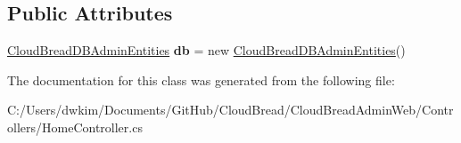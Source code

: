 \subsection*{Public Attributes}
\begin{DoxyCompactItemize}
\item 
\hyperlink{class_cloud_bread_admin_web_1_1_cloud_bread_d_b_admin_entities}{Cloud\+Bread\+D\+B\+Admin\+Entities} {\bfseries db} = new \hyperlink{class_cloud_bread_admin_web_1_1_cloud_bread_d_b_admin_entities}{Cloud\+Bread\+D\+B\+Admin\+Entities}()\hypertarget{class_cloud_bread_admin_web_1_1_controllers_1_1_home_controller_a348051ae2729879d2c661d5b2376cdab}{}\label{class_cloud_bread_admin_web_1_1_controllers_1_1_home_controller_a348051ae2729879d2c661d5b2376cdab}

\end{DoxyCompactItemize}


The documentation for this class was generated from the following file\+:\begin{DoxyCompactItemize}
\item 
C\+:/\+Users/dwkim/\+Documents/\+Git\+Hub/\+Cloud\+Bread/\+Cloud\+Bread\+Admin\+Web/\+Controllers/Home\+Controller.\+cs\end{DoxyCompactItemize}

